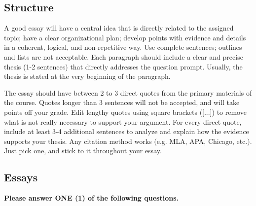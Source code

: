 \documentclass{article}
\begin{document}
\subsection*{Structure}

A good essay will have a central idea that is directly related to the assigned topic; have a clear organizational plan; develop points with evidence and details in a coherent, logical, and non-repetitive way. Use complete sentences; outlines and lists are not acceptable. Each paragraph should include a clear and precise thesis (1-2 sentences) that directly addresses the question prompt. Usually, the thesis is stated at the very beginning of the paragraph.

The essay should have between 2 to 3 direct quotes from the primary materials of the course. Quotes longer than 3 sentences will not be accepted, and will take points off your grade. Edit lengthy quotes using square brackets ([...]) to remove what is not really necessary to support your argument. For every direct quote, include at least 3-4 additional sentences to analyze and explain how the evidence supports your thesis. Any citation method works (e.g. MLA, APA, Chicago, etc.). Just pick one, and stick to it throughout your essay.


\subsection*{Essays}

{\bf Please answer ONE (1) of the following questions.} 
\end{document}
